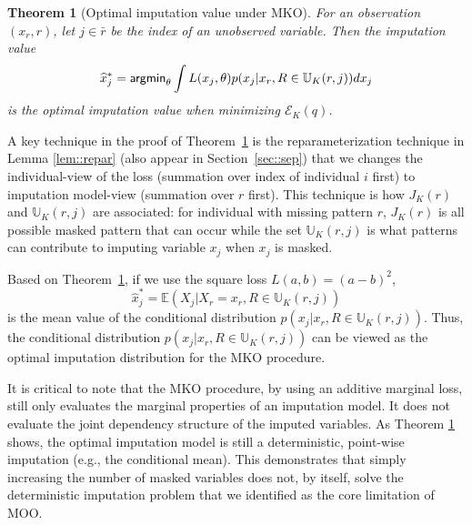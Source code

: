 \documentclass[aos, preprint]{imsart}
\theoremstyle{plain}
\newtheorem{theorem}{Theorem}[section]
\theoremstyle{definition}
\let\hat\widehat
\newcommand{\E}{\mbox{$\mathbb{E}$}}
\begin{document}
\begin{appendix}
\begin{theorem}[Optimal imputation value under MKO]
\label{thm::mko}
For an observation $(x_r,r)$, let $j \in \bar r$ be the index of an unobserved variable. 
Then the imputation value
\begin{equation}
\hat x^*_j = {\sf argmin}_{\theta} \int L( x_j,\theta ) p(x_j|x_{r}, R\in \mathbb{U}_K(r, j))dx_j
\label{eq::opt::value::mko}
\end{equation}
is the optimal imputation value when minimizing $ {\mathcal{E}}_{K }(q )$.
\end{theorem}


A key technique in the proof of Theorem~\ref{thm::mko}
is the reparameterization technique in Lemma \ref{lem::repar}  (also appear in Section~\ref{sec::sep})
that we changes the individual-view of the loss (summation over index of individual $i$ first)
to imputation model-view (summation over $r$ first). 
This technique is how   $J_K(r)$ and 
$\mathbb{U}_K(r, j)$
are associated: for individual with missing pattern $r$, $J_K(r)$
is all possible masked pattern that can occur while the set $\mathbb{U}_K(r, j)$
is what patterns can contribute to imputing variable $ x_j$ when $ x_j$  is masked.



Based on Theorem~\ref{thm::mko}, if we use the square loss $L(a,b) = (a-b)^2$,
$$
\hat x^*_j = \E(X_j|X_r = x_r, R\in \mathbb{U}_K(r, j))
$$
is the mean value of the conditional distribution $p(x_j|x_r, R\in \mathbb{U}_K(r, j))$.
Thus, the conditional distribution $p(x_j|x_r, R\in \mathbb{U}_K(r, j))$
can be viewed as the optimal imputation distribution
for the MKO procedure. 

It is critical to note that the MKO procedure, by using an additive marginal loss, still only evaluates the marginal properties of an imputation model. It does not evaluate the joint dependency structure of the imputed variables. As Theorem \ref{thm::mko} shows, the optimal imputation model is still a deterministic, point-wise imputation (e.g., the conditional mean). This demonstrates that simply increasing the number of masked variables does not, by itself, solve the deterministic imputation problem that we identified as the core limitation of MOO.





\end{appendix}
\end{document}
